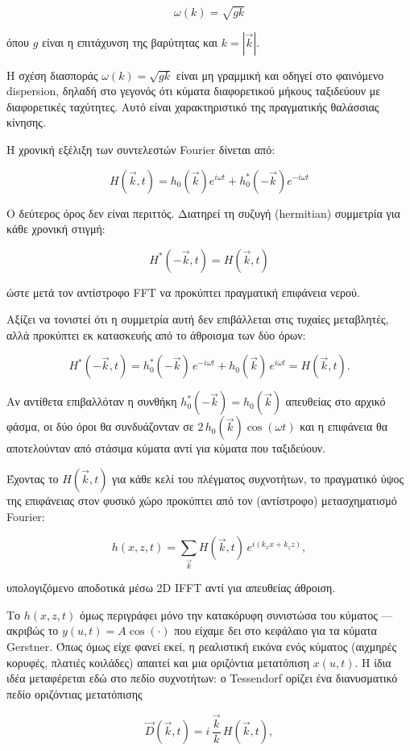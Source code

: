 \[
\omega(k)=\sqrt{gk}
\]

όπου \(g\) είναι η επιτάχυνση της βαρύτητας και \(k = |\vec{k}|\).

Η σχέση διασποράς \(\omega(k) = \sqrt{gk}\) είναι μη γραμμική και οδηγεί
στο φαινόμενο dispersion, δηλαδή στο γεγονός ότι κύματα διαφορετικού
μήκους ταξιδεύουν με διαφορετικές ταχύτητες. Αυτό είναι χαρακτηριστικό
της πραγματικής θαλάσσιας κίνησης.

Η χρονική εξέλιξη των συντελεστών Fourier δίνεται από:

\[
H(\vec{k},t)
=
h_0(\vec{k})e^{i\omega t}
+
h_0^*(-\vec{k})e^{-i\omega t}
\]

Ο δεύτερος όρος δεν είναι περιττός. Διατηρεί τη συζυγή (hermitian)
συμμετρία για κάθε χρονική στιγμή:

\[
H^*(-\vec{k},t)=H(\vec{k},t)
\]

ώστε μετά τον αντίστροφο FFT να προκύπτει πραγματική επιφάνεια νερού.

Αξίζει να τονιστεί ότι η συμμετρία αυτή δεν επιβάλλεται στις τυχαίες
μεταβλητές, αλλά προκύπτει εκ κατασκευής από το άθροισμα των δύο όρων:

\[
H^*(-\vec{k},t) = h_0^*(-\vec{k})\,e^{-i\omega t} + h_0(\vec{k})\,e^{i\omega t} = H(\vec{k},t).
\]

Αν αντίθετα επιβαλλόταν η συνθήκη \(h_0^*(-\vec{k}) = h_0(\vec{k})\)
απευθείας στο αρχικό φάσμα, οι δύο όροι θα συνδυάζονταν σε
\(2\,h_0(\vec{k})\cos(\omega t)\) και η επιφάνεια θα αποτελούνταν από
στάσιμα κύματα αντί για κύματα που ταξιδεύουν.

Έχοντας το \(H(\vec{k},t)\) για κάθε κελί του πλέγματος συχνοτήτων, το
πραγματικό ύψος της επιφάνειας στον φυσικό χώρο προκύπτει από τον
(αντίστροφο) μετασχηματισμό Fourier:

\[
h(x,z,t) = \sum_{\vec{k}} H(\vec{k},t)\, e^{i(k_xx+k_zz)},
\]

υπολογιζόμενο αποδοτικά μέσω 2D IFFT αντί για απευθείας άθροιση.

Το \(h(x,z,t)\) όμως περιγράφει μόνο την κατακόρυφη συνιστώσα του
κύματος --- ακριβώς το \(y(u,t)=A\cos(\cdot)\) που είχαμε δει στο
κεφάλαιο για τα κύματα Gerstner. Όπως όμως είχε φανεί εκεί, η ρεαλιστική
εικόνα ενός κύματος (αιχμηρές κορυφές, πλατιές κοιλάδες) απαιτεί και μια
οριζόντια μετατόπιση \(x(u,t)\). Η ίδια ιδέα μεταφέρεται εδώ στο πεδίο
συχνοτήτων: ο Tessendorf ορίζει ένα διανυσματικό πεδίο οριζόντιας
μετατόπισης

\[
\vec{D}(\vec{k},t) = i\,\frac{\vec{k}}{k}\,H(\vec{k},t),
\]

